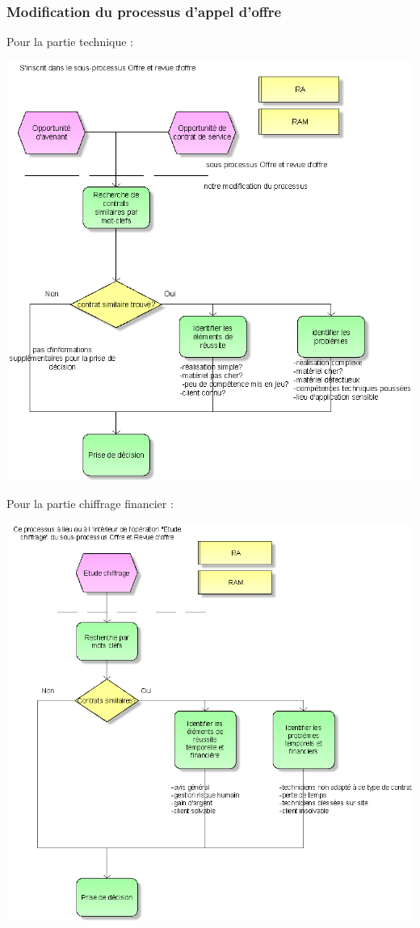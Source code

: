 \subsubsection{Modification du processus d'appel d'offre}
Pour la partie technique :
\begin {center}
\includegraphics[width=\textwidth]{png_cible_fonctionnelle/AideFaisabiliteTechnique.png}
\end {center}

Pour la partie chiffrage financier :
\begin {center}
\includegraphics[width=\textwidth]{png_cible_fonctionnelle/AideChiffrageFinanciere.png}
\end {center}

